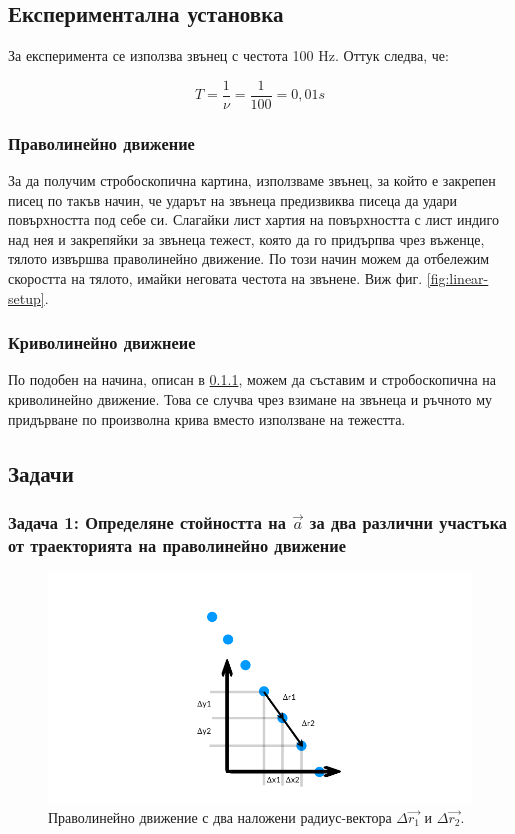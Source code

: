 \documentclass[12pt]{article}
\begin{document}
\subsection{Експериментална установка}
За експеримента се използва звънец с честота 100 Hz. Оттук следва, че:

\begin{equation}
T = \frac{1}{\nu} = \frac{1}{100} = 0,01 s
\end{equation}

\subsubsection{Праволинейно движение}\label{sec:linear-movement}
За да получим стробоскопична картина, използваме звънец, за който е закрепен писец по такъв начин, че ударът на звънеца предизвиква писеца да удари повърхността под себе си. Слагайки лист хартия на повърхността с лист индиго над нея и закрепяйки за звънеца тежест, която да го придърпва чрез въженце, тялото извършва праволинейно движение. По този начин можем да отбележим скоростта на тялото, имайки неговата честота на звънене. Виж фиг. \ref{fig:linear-setup}.

\subsubsection{Криволинейно движнеие}
По подобен на начина, описан в \ref{sec:linear-movement}, можем да съставим и стробоскопична на криволинейно движение. Това се случва чрез взимане на звънеца и ръчното му придърване по произволна крива вместо използване на тежестта.

\subsection{Задачи}
\subsubsection{Задача 1: Определяне стойността на \(\vec{a}\) за два различни участъка от траекторията на праволинейно движение}

\begin{figure}
\centering
\includegraphics[width=1\textwidth]{images/linear-with-radius-vectors.png}
\caption{\label{fig:linear-with-radius-vectors} Праволинейно движение с два наложени радиус-вектора \(\Delta \vec{r_1}\) и \(\Delta \vec{r_2}\).}
\end{figure}
\end{document}
